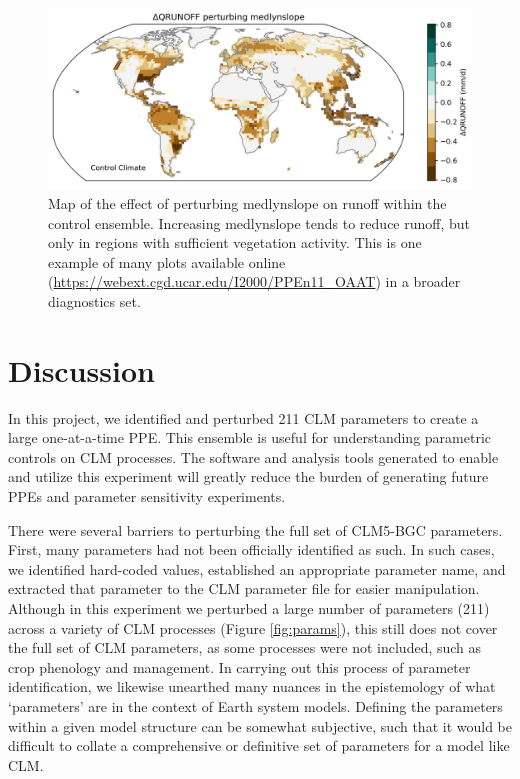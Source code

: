 \documentclass[draft]{agujournal2019}
\begin{document}
\begin{figure}[h]
\centering
\includegraphics[width=\textwidth]{../figs/QRUNOFFabs_x_medlynslope_CTL2010.png}
\caption{Map of the effect of perturbing medlynslope on runoff within the control ensemble. Increasing medlynslope tends to reduce runoff, but only in regions with sufficient vegetation activity. This is one example of many plots available online (\url{https://webext.cgd.ucar.edu/I2000/PPEn11_OAAT}) in a broader diagnostics set. }
\label{fig:map}
\end{figure}

\section{Discussion}

In this project, we identified and perturbed 211 CLM parameters to create a large one-at-a-time PPE. This ensemble is useful for understanding parametric controls on CLM processes. The software and analysis tools generated to enable and utilize this experiment will greatly reduce the burden of generating future PPEs and parameter sensitivity experiments.

There were several barriers to perturbing the full set of CLM5-BGC parameters. First, many parameters had not been officially identified as such. In such cases, we identified hard-coded values, established an appropriate parameter name, and extracted that parameter to the CLM parameter file for easier manipulation. Although in this experiment we perturbed a large number of parameters (211) across a variety of CLM processes (Figure \ref{fig:params}), this still does not cover the full set of CLM parameters, as some processes were not included, such as crop phenology and management. In carrying out this process of parameter identification, we  likewise unearthed many nuances in  the epistemology of what  `parameters' are in the context of Earth system models. Defining the parameters within a given model structure can be somewhat subjective, such that it would be difficult to collate a comprehensive or definitive set of parameters for a model like CLM.
\end{document}
